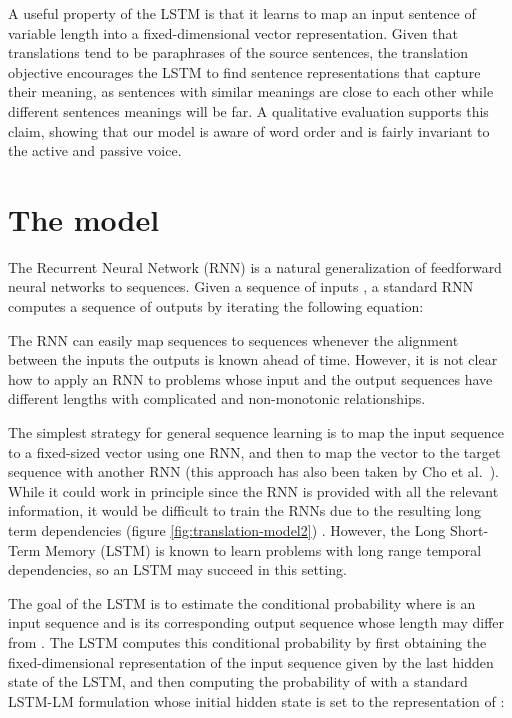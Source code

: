 \documentclass{article} \usepackage{nips14submit_e}
\begin{document}
A useful property of the LSTM is that it learns to map an input
sentence of variable length into a fixed-dimensional vector
representation.  Given that translations tend to be paraphrases of the
source sentences, the translation objective encourages the LSTM to
find sentence representations that capture their meaning, as sentences
with similar meanings are close to each other while different
sentences meanings will be far. A qualitative evaluation supports
this claim, showing that our model is aware of word order and is
fairly invariant to the active and passive voice.

 

\section{The model}
\label{sec:model}

The Recurrent Neural Network (RNN) \cite{werbos,rumelhart1986learning}
is a natural generalization of feedforward neural networks to
sequences.  Given a sequence of inputs , a
standard RNN computes a sequence of outputs  by
iterating the following equation: 

The RNN can easily map sequences to sequences whenever the alignment
between the inputs the outputs is known ahead of time. However, it is
not clear how to apply an RNN to problems whose input and the output
sequences have different lengths with complicated and non-monotonic
relationships.

The simplest strategy for general sequence learning is to map the input
sequence to a fixed-sized vector using one RNN, and then to map the
vector to the target sequence with another RNN (this approach has also been
taken by Cho et al.~\cite{cho14}).  While it could work
in principle since the RNN is provided with all the relevant
information, it would be difficult to train the RNNs due to the
resulting long term dependencies
(figure \ref{fig:translation-model2})
\cite{hochreiter_long_term,bengio_long_term,hochreiter97,Hochreiter01gradientflow}. However, the Long
Short-Term Memory (LSTM) \cite{hochreiter97} is known to learn
problems with long range temporal dependencies, so an LSTM may succeed
in this setting.

The goal of the LSTM is to estimate the conditional probability
 where  is an
input sequence and  is its corresponding output
sequence whose length  may differ from . The LSTM computes this
conditional probability by first obtaining the fixed-dimensional
representation  of the input sequence  given by
the last hidden state of the LSTM, and then computing the probability
of  with a standard LSTM-LM formulation whose
initial hidden state is set to the representation  of
:
\end{document}
